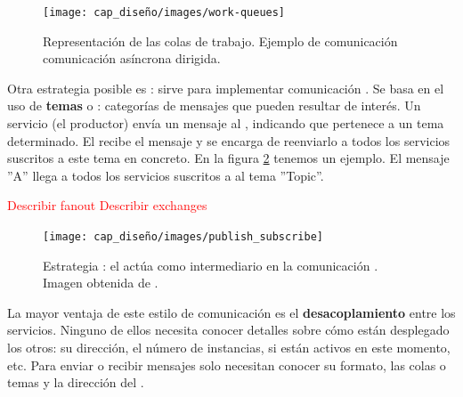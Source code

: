 \begin{figure}[htb]
  \centering
  \texttt{[image: cap\_diseño/images/work-queues]}
  \caption[Representación de las colas de trabajo. Ejemplo de comunicación asíncrona dirigida.]{Representación de las colas de trabajo. Ejemplo de comunicación comunicación asíncrona dirigida. \footnotemark }
  \label{fig:work-queues}
\end{figure}


Otra estrategia posible es : sirve para implementar comunicación . Se basa en el uso de \textbf{temas} o \textbf{}: categorías de mensajes que pueden resultar de interés. Un servicio (el productor) envía un mensaje al , indicando que pertenece a un tema determinado. El  recibe el mensaje y se encarga de reenviarlo a todos los servicios suscritos a este tema en concreto. \cite{rabbitmqPublishSubscribeDocumentation} En la figura \ref{fig:publish-subscribe} tenemos un ejemplo. El mensaje ''A'' llega a todos los servicios suscritos a al tema ''Topic''.

\textcolor{red}{Describir fanout}
\textcolor{red}{Describir exchanges}

\begin{figure}[htb]
  \centering
  \texttt{[image: cap\_diseño/images/publish\_subscribe]}
  \caption[Estrategia : el  actúa como intermediario en la comunicación .]{Estrategia : el  actúa como intermediario en la comunicación . Imagen obtenida de \footnotemark.}
  \label{fig:publish-subscribe}
\end{figure}


La mayor ventaja de este estilo de comunicación es el \textbf{desacoplamiento} entre los servicios. \cite{korabUnderstandingMessageBrokers2017}
Ninguno de ellos necesita conocer detalles sobre cómo están desplegado los otros: su dirección, el número de instancias, si están activos en este momento, etc. Para enviar o recibir mensajes solo necesitan conocer su formato, las colas o temas y la dirección del .

